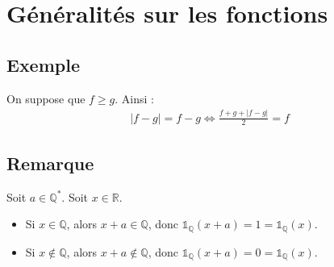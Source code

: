 \documentclass[../main.tex]{subfiles}
\begin{document}
\setcounter{chapter}{3}
\chapter{Généralités sur les fonctions}
\tableofcontents
\clearpage

\setcounter{section}{20}
\section{Exemple}
On suppose que $f \geq g$. Ainsi :
\begin{align*}
    | f - g | = f - g \Leftrightarrow \frac{f + g + | f - g |}{2} = f
\end{align*}

\setcounter{section}{22}
\section{Remarque}
Soit $a \in \mathbb{Q}^*$. Soit $x \in \mathbb{R}$. 
\begin{itemize}
    \item Si $x \in \mathbb{Q}$, alors $x + a \in \mathbb{Q}$, donc $\mathds{1}_{\mathbb{Q}}(x + a) = 1 = \mathds{1}_{\mathbb{Q}}(x)$.
    \item Si $x \notin \mathbb{Q}$, alors $x + a \notin \mathbb{Q}$, donc $\mathds{1}_{\mathbb{Q}}(x + a) = 0 = \mathds{1}_{\mathbb{Q}}(x)$.
\end{itemize}

\setcounter{section}{26}
\end{document}
